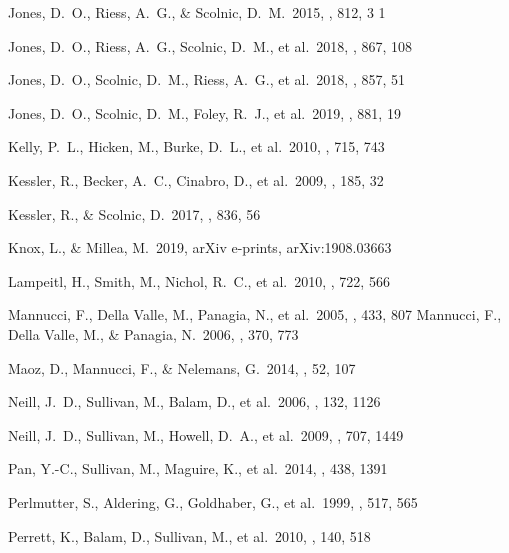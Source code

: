 \documentclass[]{aa} %
\begin{document}
\begin{thebibliography}{}

 Jones, D.~O., Riess, A.~G., \& Scolnic, D.~M.\ 2015, \apj, 812, 3
1

 Jones, D.~O., Riess, A.~G., Scolnic, D.~M., et al.\ 2018, \apj, 867, 108

 Jones, D.~O., Scolnic, D.~M., Riess, A.~G., et al.\ 2018, \apj, 857, 51

 Jones, D.~O., Scolnic, D.~M., Foley, R.~J., et al.\ 2019, \apj, 881, 19

 Kelly, P.~L., Hicken, M., Burke, D.~L., et al.\ 2010, \apj, 715, 743

 Kessler, R., Becker, A.~C., Cinabro, D., et al.\ 2009, \apjs, 185, 32

 Kessler, R., \& Scolnic, D.\ 2017, \apj, 836, 56

 Knox, L., \& Millea, M.\ 2019, arXiv e-prints, arXiv:1908.03663

 Lampeitl, H., Smith, M., Nichol, R.~C., et al.\ 2010, \apj, 722, 566

 Mannucci, F.,
  Della Valle, M., Panagia, N., et al.\ 2005, \aap, 433, 807 
 Mannucci, F.,
  Della Valle, M., \& Panagia, N.\ 2006, \mnras, 370, 773 

 Maoz, D., Mannucci,
  F., \& Nelemans, G.\ 2014, \araa, 52, 107 


 Neill, J.~D., Sullivan, M., Balam, D., et al.\ 2006, \aj, 132, 1126

 Neill, J.~D., Sullivan, M., Howell, D.~A., et al.\ 2009, \apj, 707, 1449

 Pan, Y.-C., Sullivan, M., Maguire, K., et al.\ 2014, \mnras, 438, 1391

 Perlmutter, S., Aldering, G., Goldhaber, G., et al.\ 1999, \apj, 517, 565

 Perrett, K., Balam, D., Sullivan, M., et al.\ 2010, \aj, 140, 518


\end{thebibliography}
\end{document}
